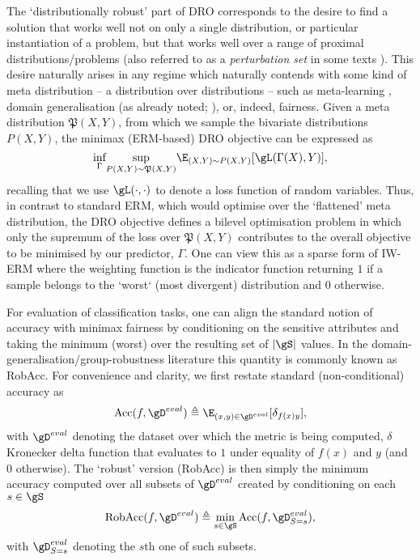 The `distributionally robust' part of DRO corresponds to the desire to find a solution that works
well not on only a single distribution, or particular instantiation of a problem, but that works
well over a range of proximal distributions/problems (also referred to as a \emph{perturbation
set} in some texts \citep{ben2009robust}). 
%
This desire naturally arises in any regime which naturally contends with some kind of meta
distribution -- a distribution over distributions -- such as meta-learning \citep{collins2020task},
domain generalisation (as already noted; \cite{sagawa2019distributionally}), or, indeed, fairness.
%
Given a meta distribution \(\mathfrak{P}(X, Y)\), from which we sample the bivariate distributions \(
P(X, Y) \), the minimax (\ac{ERM}-based) \ac{DRO} objective can be expressed as 
%
\begin{equation}
    \underset{\Gamma}{\text{inf}} 
    \underset{P(X, Y) \sim \mathfrak{P}(X, Y)}{\text{sup}}
    \E_{(X, Y) \sim P(X, Y)}[\gL(\Gamma(X), Y) ],
 \end{equation}
%
recalling that we use \(\gL(\cdot, \cdot)\) to denote a loss function of random variables.
%
Thus, in contrast to standard \ac{ERM}, which would optimise over the `flattened' meta distribution, the
DRO objective defines a bilevel optimisation problem in which only the supremum of the loss
over \( \mathfrak{P}(X, Y) \) contributes to the overall objective to be minimised by our
predictor, \(\Gamma\).
%
One can view this as a sparse form of \ac{IW}-\ac{ERM} where the weighting function is the indicator function
returning \(1\) if a sample belongs to the `worst` (most divergent) distribution and \(0\)
otherwise.

%
For evaluation of classification tasks, one can align the standard notion of accuracy with minimax
fairness by conditioning on the sensitive attributes and taking the minimum (worst) over the
resulting set of \(|\gS|\) values. 
%
In the domain-generalisation/group-robustness literature this quantity is commonly known as
\ac{RobAcc}.
%
For convenience and clarity, we first restate standard (non-conditional) accuracy as 
%
\begin{equation}
    \text{Acc}(f, \gD^{eval}) \triangleq 
    \E_{ (x, y) \in \gD^{eval}}[ \delta_{f(x)y} ],
 \end{equation}
%
with \( \gD^{eval} \) denoting the dataset over which the metric is being computed, \( \delta
\) Kronecker delta function that evaluates to \(1\) under equality of \(f(x)\) and \(y\) (and \(0\)
otherwise).
%
The `robust' version (\acs{RobAcc}) is then simply the minimum accuracy computed over all subsets of \(
\gD^{eval} \) created by conditioning on each \(s \in \gS \)
%
\begin{equation}
    \text{RobAcc}(f, \gD^{eval}) \triangleq 
    \underset{s \in \gS}{\text{min}} \, \text{Acc}(f, \gD^{eval}_{S=s}),
 \end{equation}
%
 with \( \gD^{eval}_{S=s} \) denoting the \(s\)th one of such subsets.

